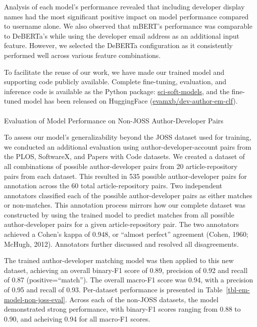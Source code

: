 \documentclass[
  letterpaper,
  DIV=11,
  numbers=noendperiod]{scrartcl}
\makeatletter
\let\oldparagraph\paragraph
\renewcommand{\paragraph}{
    \@ifstar
      \xxxParagraphStar
      \xxxParagraphNoStar
  }
\newcommand{\xxxParagraphStar}[1]{\oldparagraph*{#1}\mbox{}}
\newcommand{\xxxParagraphNoStar}[1]{\oldparagraph{#1}\mbox{}}
\makeatother
\begin{document}
Analysis of each model's performance revealed that including developer
display names had the most significant positive impact on model
performance compared to username alone. We also observed that mBERT's
performance was comparable to DeBERTa's while using the developer email
address as an additional input feature. However, we selected the DeBERTa
configuration as it consistently performed well across various feature
combinations.

To facilitate the reuse of our work, we have made our trained model and
supporting code publicly available. Complete fine-tuning, evaluation,
and inference code is available as the Python package:
\href{https://github.com/evamaxfield/sci-soft-models}{sci-soft-models},
and the fine-tuned model has been released on HuggingFace
(\href{https://huggingface.co/evamxb/dev-author-em-clf}{evamxb/dev-author-em-clf}).

\paragraph{Evaluation of Model Performance on Non-JOSS Author-Developer
Pairs}\label{evaluation-of-model-performance-on-non-joss-author-developer-pairs}

To assess our model's generalizability beyond the JOSS dataset used for
training, we conducted an additional evaluation using
author-developer-account pairs from the PLOS, SoftwareX, and Papers with
Code datasets. We created a dataset of all combinations of possible
author-developer pairs from 20 article-repository pairs from each
dataset. This resulted in 535 possible author-developer pairs for
annotation across the 60 total article-repository pairs. Two independent
annotators classified each of the possible author-developer pairs as
either matches or non-matches. This annotation process mirrors how our
complete dataset was constructed by using the trained model to predict
matches from all possible author-developer pairs for a given
article-repository pair. The two annotators achieved a Cohen's kappa of
0.948, or ``almost perfect'' agreement (Cohen, 1960; McHugh, 2012).
Annotators further discussed and resolved all disagreements.

The trained author-developer matching model was then applied to this new
dataset, achieving an overall binary-F1 score of 0.89, precision of 0.92
and recall of 0.87 (positive=``match''). The overall macro-F1 score was
0.94, with a precision of 0.95 and recall of 0.93. Per-dataset
performance is presented in Table~\ref{tbl-em-model-non-joss-eval}.
Across each of the non-JOSS datasets, the model demonstrated strong
performance, with binary-F1 scores ranging from 0.88 to 0.90, and
acheiving 0.94 for all macro-F1 scores.
\end{document}
